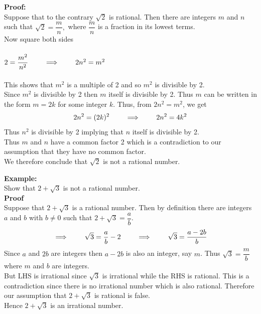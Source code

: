 \documentclass[11pt,a4paper]{article}
\begin{document}
\begin{enumerate}
\textbf{Proof:}\\
Suppose that to the contrary $\sqrt{2}$ is rational. Then there are integers $m$ and $n$ such that $\sqrt{2}=\dfrac{m}{n},$ where $\dfrac{m}{n}$ is a fraction in its lowest terms.\\ Now square both sides\\\\ $2=\dfrac{m^2}{n^2}\hspace{0.7cm} \implies \hspace{0.7cm} 2n^2=m^2$\\\\
This shows that $m^2$ is a multiple of 2 and so $m^2$ is divisible by 2.\\
Since $m^2$ is divisible by 2 then $m$ itself is divisible by 2. Thus $m$ can be written in the form $m=2k$ for some integer $k$. Thus, from $2n^2=m^2$, we get $$2n^2=(2k)^2\hspace{0.7cm} \implies \hspace{0.7cm} 2n^2=4k^2$$
Thus $n^2$ is divisible by 2 implying that $n$ itself is divisible by 2.\\
Thus $m$ and $n$ have a common factor 2 which is a contradiction to our assumption that they have no common factor.\\ We therefore conclude that $\sqrt{2}$ is not a rational number.\\
\end{enumerate}


\textbf{Example:}\\
Show that $2+\sqrt{3}$ is not a rational number.\\

\textbf{Proof}\\
Suppose that $2+\sqrt{3}$ is a rational number. Then by definition there are integers $a$ and $b$ with $b\neq 0$ such that $2+\sqrt{3}=\dfrac{a}{b}$.$$\implies \hspace{0.7cm} \sqrt{3}=\frac{a}{b}-2\hspace{0.7cm} \implies \hspace{0.7cm}\sqrt{3}=\frac{a-2b}{b}$$
Since $a$ and $2b$ are integers then $a-2b$ is also an integer, say $m$. Thus $\sqrt{3}=\dfrac{m}{b}$ where $m$ and $b$ are integers.\\
But LHS is irrational since $\sqrt{3}$ is irrational while the RHS is rational. This is a contradiction since there is no irrational number which is also rational.
Therefore our assumption that $2+\sqrt{3}$ is rational is false.\\ Hence $2+\sqrt{3}$ is an irrational number.\\\\
\end{document}

